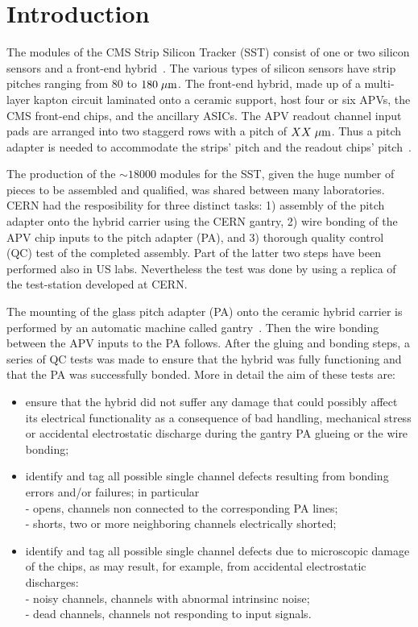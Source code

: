 \section{Introduction}

The modules of the CMS Strip Silicon Tracker (SST) consist of one or
two silicon sensors and a front-end
hybrid~\cite{tdr,modules,sensors,hybrid}. The various types of  
silicon sensors have strip pitches ranging from $80$ to $180\; \mu \rm m$. The
front-end hybrid, made up of a multi-layer kapton circuit laminated
onto a ceramic support, host four 
or six APVs, the CMS front-end chips, and the ancillary ASICs. The APV
readout channel input pads are arranged into two staggerd rows with a
pitch of $XX\; \mu \rm m$. Thus a pitch adapter is needed to accommodate the 
strips' pitch and the readout chips' pitch~\cite{pa}.
 
The production of the $\sim18000$ modules for the SST, given the huge number of
pieces to be assembled and qualified, was shared between many 
laboratories. CERN had the resposibility for three distinct tasks: 1)
assembly of the pitch adapter onto the hybrid carrier using the CERN
gantry, 2) wire bonding of the APV chip inputs to the pitch adapter (PA),
and 3) thorough quality control (QC) test of the completed
assembly. Part of the latter two steps have been performed also in US
labs. Nevertheless the test was done by using a replica of the
test-station developed at CERN. 

The mounting of the glass pitch adapter (PA) onto the ceramic hybrid
carrier is performed by an automatic machine called
gantry~\cite{gantry}. Then the wire bonding between the APV inputs to
the PA follows. After the gluing and bonding steps, a series of QC
tests was made to ensure that the hybrid was fully functioning and
that the PA was successfully bonded. More in detail the aim of these 
tests are:
\begin{itemize}
\item ensure that the hybrid did not suffer any damage that could
  possibly affect its electrical functionality as a consequence of bad
  handling, mechanical stress or accidental electrostatic discharge
  during the gantry PA glueing or the wire bonding;
\item identify and tag all possible single channel defects resulting
  from bonding errors and/or failures; in particular\\
- opens, channels non connected
  to the corresponding PA lines;\\
- shorts, two or more neighboring
  channels electrically shorted;
\item identify and tag all possible single channel defects due to
  microscopic damage of the chips, as may result, for example, from
  accidental electrostatic discharges:\\
- noisy channels, channels with abnormal intrinsinc noise;\\
- dead channels, channels not responding to input signals.
\end{itemize}

